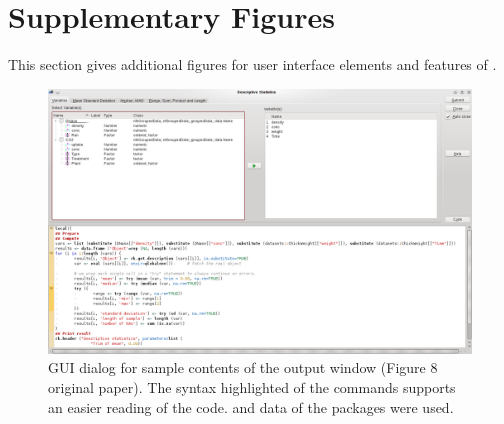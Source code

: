 \section{Supplementary Figures}
\label{sec:Supplementary_figures}
This section gives additional figures for user interface elements and features of .

\begin{figure}[!h]
 \centering
 \includegraphics[width=15.4cm]{./figures/figure8_supplement.png}
 \caption{GUI dialog for sample contents of the output window (Figure 8 original paper). The syntax highlighted of the commands supports an easier reading of the code.
  and  data of the  packages were used.}
 \label{fig:figure8_supplement}
\end{figure}